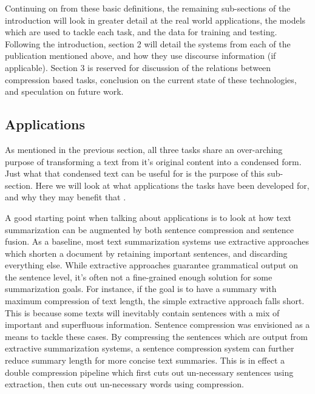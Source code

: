 {{Continuing on from these basic definitions, the remaining sub-sections of the introduction will look in greater detail at the real world applications, the models which are used to tackle each task, and the data for training and testing.  Following the introduction, section 2 will detail the systems from each of the publication mentioned above, and how they use discourse information (if applicable). Section 3 is reserved for discussion of the relations between compression based tasks, conclusion on the current state of these technologies, and speculation on future work.}


\subsection{Applications}


{As mentioned in the previous section, all three tasks share an over-arching purpose of transforming a text from it's original content into a condensed form. Just what that condensed text can be useful for is the purpose of this sub-section. Here we will look at what applications the tasks have been developed for, and why they may benefit that .}

{A good starting point when talking about applications is to look at how text summarization can be augmented by both sentence compression and sentence fusion.  As a baseline, most text summarization systems use extractive approaches which shorten a document by retaining important sentences, and discarding everything else.  While extractive approaches guarantee grammatical output on the sentence level, it's often not a fine-grained enough solution for some summarization goals.  For instance, if the goal is to have a summary with maximum compression of text length, the simple extractive approach falls short.  This is because some texts will inevitably contain sentences with a mix of important and superfluous information.  Sentence compression was envisioned as a means to tackle these cases.  By compressing the sentences which are output from extractive summarization systems, a sentence compression system can further reduce summary length for more concise text summaries\citep{Jing:2000:SRA:974147.974190}.  This is in effect a double compression pipeline which first cuts out un-necessary sentences using extraction, then cuts out un-necessary words using compression.}

}
